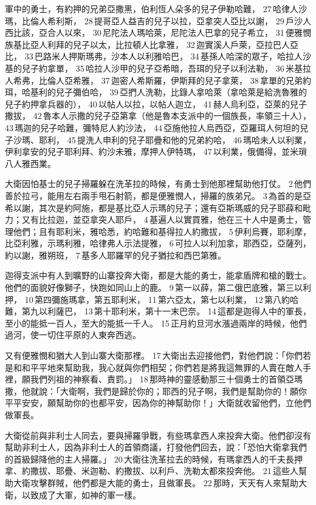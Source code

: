 軍中的勇士，有約押的兄弟亞撒黑，伯利恆人朵多的兒子伊勒哈難， 27 哈律人沙瑪，比倫人希利斯， 28 提哥亞人益吉的兒子以拉，亞拿突人亞比以謝， 29 戶沙人西比該，亞合人以來， 30 尼陀法人瑪哈萊，尼陀法人巴拿的兒子希立， 31 便雅憫族基比亞人利拜的兒子以太，比拉頓人比拿雅， 32 迦實溪人戶萊，亞拉巴人亞比， 33 巴路米人押斯瑪弗，沙本人以利雅哈巴， 34 基孫人哈深的眾子，哈拉人沙基的兒子約拿單， 35 哈拉人沙甲的兒子亞希暗，吾珥的兒子以利法勒， 36 米基拉人希弗，比倫人亞希雅， 37 迦密人希斯羅，伊斯拜的兒子拿萊， 38 拿單的兄弟約珥，哈基利的兒子彌伯哈， 39 亞捫人洗勒，比錄人拿哈萊（拿哈萊是給洗魯雅的兒子約押拿兵器的）， 40 以帖人以拉，以帖人迦立， 41 赫人烏利亞，亞萊的兒子撒拔， 42 魯本人示撒的兒子亞第拿（他是魯本支派中的一個族長，率領三十人）， 43 瑪迦的兒子哈難，彌特尼人約沙法， 44 亞施他拉人烏西亞，亞羅珥人何坦的兒子沙瑪、耶利， 45 提洗人申利的兒子耶疊和他的兄弟約哈， 46 瑪哈未人以利業，伊利拿安的兒子耶利拜、約沙未雅，摩押人伊特瑪， 47 以利業，俄備得，並米瑣八人雅西業。

大衛因怕基士的兒子掃羅躲在洗革拉的時候，有勇士到他那裡幫助他打仗。 2 他們善於拉弓，能用左右兩手甩石射箭，都是便雅憫人，掃羅的族弟兄。 3 為首的是亞希以謝，其次是約阿施，都是基比亞人示瑪的兒子；還有亞斯瑪威的兒子耶薛和毗力；又有比拉迦，並亞拿突人耶戶， 4 基遍人以實買雅，他在三十人中是勇士，管理他們；且有耶利米，雅哈悉，約哈難和基得拉人約撒拔， 5 伊利烏賽，耶利摩，比亞利雅，示瑪利雅，哈律弗人示法提雅， 6 可拉人以利加拿，耶西亞，亞薩列，約以謝，雅朔班， 7 基多人耶羅罕的兒子猶拉和西巴第雅。

迦得支派中有人到曠野的山寨投奔大衛，都是大能的勇士，能拿盾牌和槍的戰士。他們的面貌好像獅子，快跑如同山上的鹿。 9 第一以薛，第二俄巴底雅，第三以利押， 10 第四彌施瑪拿，第五耶利米， 11 第六亞太，第七以利業， 12 第八約哈難，第九以利薩巴， 13 第十耶利米，第十一末巴奈。 14 這都是迦得人中的軍長，至小的能抵一百人，至大的能抵一千人。 15 正月約旦河水漲過兩岸的時候，他們過河，使一切住平原的人東奔西逃。

又有便雅憫和猶大人到山寨大衛那裡。 17 大衛出去迎接他們，對他們說：「你們若是和和平平地來幫助我，我心就與你們相契；你們若是將我這無罪的人賣在敵人手裡，願我們列祖的神察看、責罰。」 18 那時神的靈感動那三十個勇士的首領亞瑪撒，他就說：「大衛啊，我們是歸於你的；耶西的兒子啊，我們是幫助你的！願你平平安安，願幫助你的也都平安，因為你的神幫助你！」大衛就收留他們，立他們做軍長。

大衛從前與非利士人同去，要與掃羅爭戰，有些瑪拿西人來投奔大衛。他們卻沒有幫助非利士人，因為非利士人的首領商議，打發他們回去，說：「恐怕大衛拿我們的首級歸降他的主人掃羅。」 20 大衛往洗革拉去的時候，有瑪拿西人的千夫長押拿、約撒拔、耶疊、米迦勒、約撒拔、以利戶、洗勒太都來投奔他。 21 這些人幫助大衛攻擊群賊，他們都是大能的勇士，且做軍長。 22 那時，天天有人來幫助大衛，以致成了大軍，如神的軍一樣。


